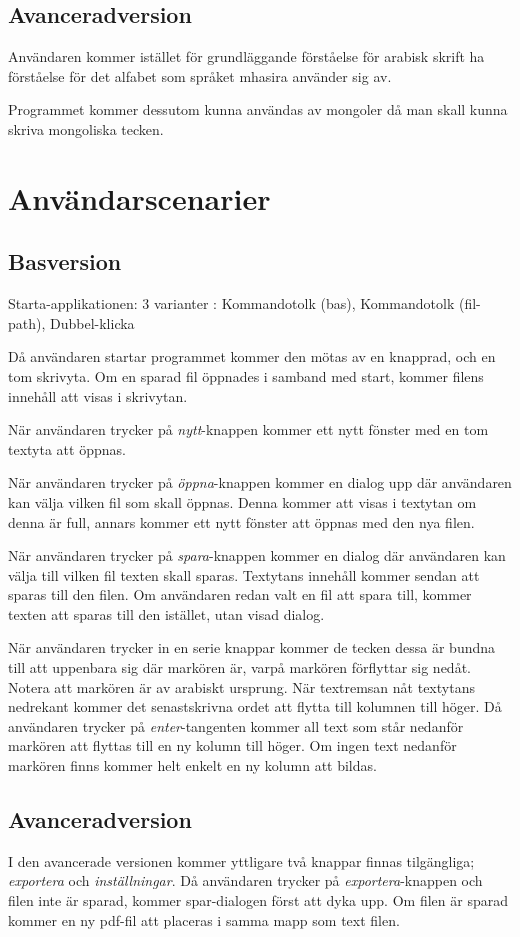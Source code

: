 \documentclass[a4paper,11p,twoside]{report}
\begin{document}
\subsection{Avanceradversion}
Användaren kommer istället för grundläggande förståelse för arabisk skrift ha förståelse för det alfabet som språket mhasira använder sig av.

Programmet kommer dessutom kunna användas av mongoler då man skall kunna skriva mongoliska tecken.

\section{Användarscenarier}
\subsection{Basversion}
Starta-applikationen: 3 varianter :
Kommandotolk (bas), Kommandotolk (fil-path), Dubbel-klicka

Då användaren startar programmet kommer den mötas av en knapprad, och en tom skrivyta. Om en sparad fil öppnades i samband med start, kommer filens innehåll att visas i skrivytan.

När användaren trycker på \emph{nytt}-knappen kommer ett nytt fönster med en tom textyta att öppnas. 

När användaren trycker på \emph{öppna}-knappen kommer en dialog upp där användaren kan välja vilken fil som skall öppnas. Denna kommer att visas i textytan om denna är full, annars kommer ett nytt fönster att öppnas med den nya filen.

När användaren trycker på \emph{spara}-knappen kommer en dialog där användaren kan välja till vilken fil texten skall sparas. Textytans innehåll kommer sendan att sparas till den filen. Om användaren redan valt en fil att spara till, kommer texten att sparas till den istället, utan visad dialog.

När användaren trycker in en serie knappar kommer de tecken dessa är bundna till att uppenbara sig där markören är, varpå markören förflyttar sig nedåt. Notera att markören är av arabiskt ursprung. När textremsan nåt textytans nedrekant kommer det senastskrivna ordet att flytta till kolumnen till höger. Då användaren trycker på \emph{enter}-tangenten kommer all text som står nedanför markören att flyttas till en ny kolumn till höger. Om ingen text nedanför markören finns kommer helt enkelt en ny kolumn att bildas.

\subsection{Avanceradversion}
I den avancerade versionen kommer yttligare två knappar finnas tilgängliga; \emph{exportera} och \emph{inställningar}. Då användaren trycker på \emph{exportera}-knappen och filen inte är sparad, kommer spar-dialogen först att dyka upp. Om filen är sparad kommer en ny pdf-fil att placeras i samma mapp som text filen.
\end{document}
